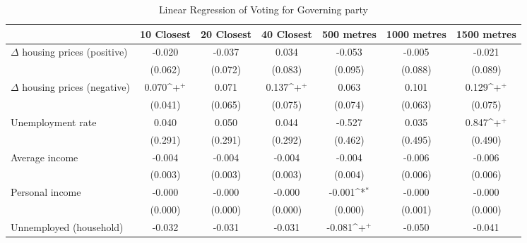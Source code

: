 \begin{table}[htbp]\centering
\def\sym#1{\ifmmode^{#1}\else\(^{#1}\)\fi}
\caption{Linear Regression of Voting for Governing party } \label{indposneg}
\begin{tabular}{l*{6}{c}}
\hline\hline
                    &\multicolumn{1}{c}{10 Closest}&\multicolumn{1}{c}{20 Closest}&\multicolumn{1}{c}{40 Closest}&\multicolumn{1}{c}{500 metres}&\multicolumn{1}{c}{1000 metres}&\multicolumn{1}{c}{1500 metres}\\
\hline
$\Delta$ housing prices (positive)&      -0.020       &      -0.037       &       0.034       &      -0.053       &      -0.005       &      -0.021       \\
                    &     (0.062)       &     (0.072)       &     (0.083)       &     (0.095)       &     (0.088)       &     (0.089)       \\
[1em]
$\Delta$ housing prices (negative)&       0.070\sym{+}&       0.071       &       0.137\sym{+}&       0.063       &       0.101       &       0.129\sym{+}\\
                    &     (0.041)       &     (0.065)       &     (0.075)       &     (0.074)       &     (0.063)       &     (0.075)       \\
[1em]
Unemployment rate   &       0.040       &       0.050       &       0.044       &      -0.527       &       0.035       &       0.847\sym{+}\\
                    &     (0.291)       &     (0.291)       &     (0.292)       &     (0.462)       &     (0.495)       &     (0.490)       \\
[1em]
Average income      &      -0.004       &      -0.004       &      -0.004       &      -0.004       &      -0.006       &      -0.006       \\
                    &     (0.003)       &     (0.003)       &     (0.003)       &     (0.004)       &     (0.006)       &     (0.006)       \\
[1em]
Personal income     &      -0.000       &      -0.000       &      -0.000       &      -0.001\sym{*}&      -0.000       &      -0.000       \\
                    &     (0.000)       &     (0.000)       &     (0.000)       &     (0.000)       &     (0.001)       &     (0.000)       \\
[1em]
Unnemployed (household)&      -0.032       &      -0.031       &      -0.031       &      -0.081\sym{+}&      -0.050       &      -0.041       \\

\end{tabular}
\end{table}
